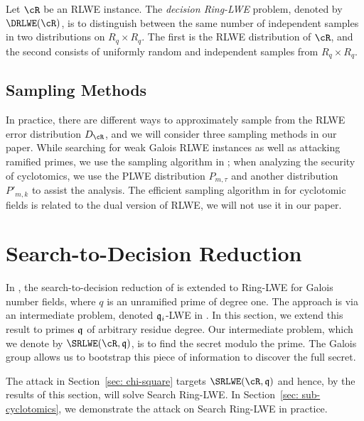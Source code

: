 \documentclass[envcountsect]{llncs}
\begin{document}
\begin{definition}
Let $\cR$ be an RLWE instance. The {\it decision Ring-LWE}
problem, denoted by $\DRLWE(\cR)$, is to distinguish between the same number of independent samples in two distributions on $R_q \times R_q$. The first is the RLWE distribution of $\cR$, and the second consists of uniformly random and independent samples from $R_q \times R_q$.
\end{definition}

\subsection{Sampling Methods}
In practice, there are different ways to approximately sample from the RLWE error distribution $D_\cR$, and we will consider three sampling methods in our paper. While searching for weak Galois RLWE instances as well as attacking ramified primes, we use the sampling algorithm in  \cite{gentry2008trapdoors}; when analyzing the security of cyclotomics, we use the PLWE distribution $P_{m,\tau}$ and another distribution $P'_{m,k}$ to assist the analysis. The efficient sampling algorithm in \cite{lyubashevsky2013toolkit} for cyclotomic fields is related to the dual version of RLWE, we will not use it in our paper.


\section{Search-to-Decision Reduction}
\label{sec: s-to-d}

In \cite{eisentrager2014weak}, the search-to-decision reduction of \cite{lyubashevsky2013ideal} is extended to Ring-LWE for Galois number fields, where $q$ is an unramified prime of degree one.  The approach is via an intermediate problem, denoted $\mathfrak{q}_i$-LWE in \cite{lyubashevsky2013ideal}.  In this section, we extend this result to primes $\mathfrak{q}$ of arbitrary residue degree.  Our intermediate problem, which we denote by $\SRLWE(\cR,\fq)$, is to find the secret modulo the prime.  The Galois group allows us to bootstrap this piece of information to discover the full secret.

The attack in Section~\ref{sec: chi-square} targets $\SRLWE(\cR,\fq)$ and hence, by the results of this section, will solve Search Ring-LWE.  In Section~\ref{sec: sub-cyclotomics}, we demonstrate the attack on Search Ring-LWE in practice.

\end{document}
